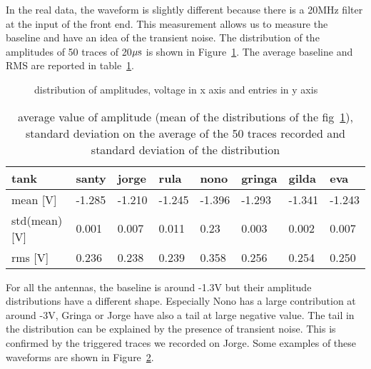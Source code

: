 In the real data, the  waveform is slightly different because there is
a 20MHz filter at the input  of the front end. This measurement allows
us to  measure the baseline and  have an idea of  the transient noise.
The distribution  of the amplitudes of  50 traces of 20$\rm  \mu s$ is
shown in  Figure~\ref{fig:distamp}.  The average baseline  and RMS are
reported in table~\ref{tab:baselines}.
\begin{figure}[ht!]
  \centering
  \hspace*{-3ex}
  \caption{distribution of amplitudes, voltage in x axis and entries in y axis}
  \label{fig:distamp}
\end{figure}

\begin{table}[!h]
\centering
\caption{average value of amplitude  (mean of the distributions of the
  fig~\ref{fig:distamp}), standard deviation on  the average of the 50
  traces recorded and standard deviation of the distribution }
\label{tab:baselines}
\begin{tabular}{ |l|l|l|l|l|l|l|l| }
\hline
tank & santy & jorge & rula & nono & gringa & gilda & eva \\ \hline \hline 
mean [V] & -1.285 & -1.210 & -1.245 & -1.396 & -1.293 & -1.341 & -1.243 \\ \hline
std(mean) [V] & 0.001 & 0.007 & 0.011 & 0.23 & 0.003 & 0.002 & 0.007\\ \hline
rms [V]  & 0.236 & 0.238 & 0.239 & 0.358 & 0.256 & 0.254 & 0.250\\ \hline
\end{tabular}
\end{table}
For all the antennas, the baseline is around -1.3V but their amplitude
distributions  have a different  shape.  Especially  Nono has  a large
contribution at around -3V, Gringa or  Jorge have also a tail at large
negative value.  The tail in  the distribution can be explained by the
presence of transient noise. This is confirmed by the triggered traces
we recorded on  Jorge.  Some examples of these  waveforms are shown in
Figure~\ref{fig:transient}.
\begin{figure}[ht!]
  \centering
  \hspace*{-3ex}
  \caption{}
  \label{fig:transient}
\end{figure}

